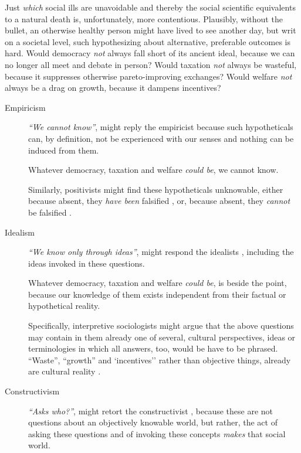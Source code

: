 Just \emph{which} social ills are unavoidable and thereby the social scientific equivalents to a natural death is, unfortunately, more contentious. 
Plausibly, without the bullet, an otherwise healthy person might have lived to see another day, but writ on a societal level, such hypothesizing about alternative, preferable outcomes is hard. 
Would democracy \emph{not} always fall short of its ancient ideal, because we can no longer all meet and debate in person? 
Would taxation \emph{not} always be wasteful, because it suppresses otherwise pareto-improving exchanges? 
Would welfare \emph{not} always be a drag on growth, because it dampens incentives?


\begin{description}
	\item[Empiricism \label{itm:empiricism}]
	\emph{``We cannot know''}, might reply the empiricist \citep{Bacon1620,Locke1689,Hume1739} because such hypotheticals can, by definition, not be experienced with our senses and nothing can be induced from them. %
	
	Whatever democracy, taxation and welfare \emph{could be}, we cannot know.
	
	Similarly, positivists might find these hypotheticals unknowable, either because absent, they \emph{have been} falsified \citep{Comte1842,Durkheim1895}, or, because absent, they \emph{cannot} be falsified \citep{Popper1934}.
	
	\item[Idealism  \label{itm:idealism}] 
	\emph{``We know only through ideas''}, might respond the idealists \citep[broadly][]{Kant1781,Hegel1807}, including the ideas invoked in these questions. 
	
	Whatever democracy, taxation and welfare \emph{could be}, is beside the point, because our knowledge of them exists independent from their factual or hypothetical reality. 
	
	Specifically, interpretive sociologists \citep{Weber1897} might argue that the above questions may contain in them already one of several, cultural perspectives, ideas or terminologies in which all answers, too, would be have to be phrased. 
	``Waste'', ``growth'' and `incentives'' rather than objective things, already are cultural reality \citep[compare][]{Beland2010}.
	
	\item[Constructivism  \label{itm:constructivism}]
	\emph{``Asks \emph{who}?''}, might retort the constructivist \citep{Berger1966,Paul1984}, because these are not questions about an objectively knowable world, but rather, the act of asking these questions and of invoking these concepts \emph{makes} that social world.
	

\end{description}
